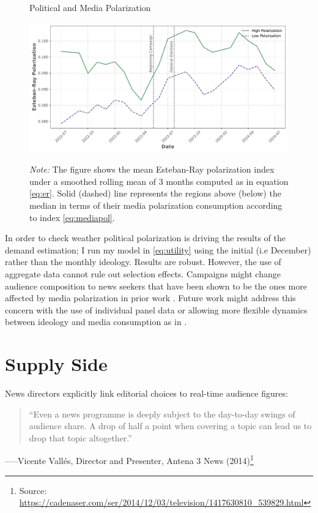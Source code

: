 \documentclass[12pt]{article}
\begin{document}
\begin{figure}[ht!]

	\centering
		\caption{Political and Media Polarization}
	\includegraphics[width=150mm]{figures/er_polarization_stata_group}
				\label{fig:er1}
	\caption*{\textit{Note:} \small The figure shows the mean Esteban-Ray polarization index under a smoothed rolling mean of 3 months computed as in equation \ref{eq:er}.  Solid (dashed) line represents the regions above (below) the median in terms of their media polarization consumption according to index \ref{eq:mediapol}.   }

\end{figure}

 In order to check weather political polarization is driving the results of the demand estimation; I run my model in \ref{eq:utility} using the initial (i.e December) rather than the monthly ideology. Results are robust.  However, the use of aggregate data cannot rule out selection effects. Campaigns might change audience composition to news seekers that have been shown to be the ones more affected by media polarization in prior work \citep{levendusky}. Future work might address this concern with the use of individual panel data or allowing more flexible dynamics between ideology and media consumption as in \cite{martin2017}.




\section{Supply Side}


\label{sec:supply}

News directors explicitly link editorial choices to real-time audience figures:

\begin{quote}
	“Even a news programme is deeply subject to the day-to-day swings of audience share.  
	A drop of half a point when covering a topic can lead us to drop that topic altogether.”
\end{quote}
\hspace*{\fill}\small–––Vicente Vallés, Director and Presenter, Antena 3 News (2014)\footnote{Source: \url{https://cadenaser.com/ser/2014/12/03/television/1417630810_539829.html}}
\end{document}
